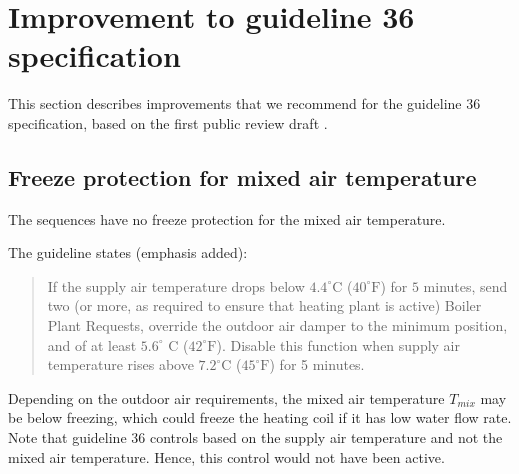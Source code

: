 \documentclass[letterpaper,10pt, openany,english]{sphinxmanual}
\begin{document}
\clearpage


\section{Improvement to guideline 36 specification}
\label{\detokenize{example:improvement-to-guideline-36-specification}}\label{\detokenize{example:sec-imp-spe-cas1}}
This section describes improvements that we recommend for the guideline 36
specification, based on the first public review draft .


\subsection{Freeze protection for mixed air temperature}
\label{\detokenize{example:freeze-protection-for-mixed-air-temperature}}\label{\detokenize{example:sec-fre-pro}}
The sequences have no freeze protection for the mixed air temperature.

The guideline states (emphasis added):
\begin{quote}

If the supply air temperature drops below \(4.4^\circ \mathrm C\) (\(40^\circ \mathrm F\)) for \(5\) minutes, send two
(or more, as required to ensure that heating plant is active) Boiler Plant
Requests, override the outdoor air damper to the minimum position, and
 of at least \(5.6^\circ\) C
(\(42^\circ \mathrm F\)). Disable this function when supply air temperature rises above \(7.2^\circ \mathrm C\)
(\(45^\circ \mathrm F\)) for 5 minutes.
\end{quote}

Depending on the outdoor air requirements, the mixed air temperature \(T_{mix}\) may be below freezing,
which could freeze the heating coil if it has low water flow rate.
Note that guideline 36 controls based on the supply air temperature and not the mixed air temperature.
Hence, this control would not have been active.
\end{document}
